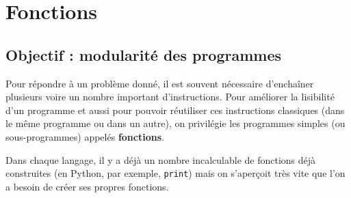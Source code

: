 



\section{Fonctions}
\subsection{Objectif : modularité des programmes}

Pour répondre à un problème donné, il est souvent nécessaire d'enchaîner plusieurs voire un nombre 
important d'instructions. Pour améliorer la lisibilité d'un programme et aussi pour pouvoir réutiliser 
ces instructions classiques (dans le même programme ou dans un autre),
on privilégie les programmes simples (ou sous-programmes) appelés \textbf{fonctions}.

Dans chaque langage, il y a déjà un nombre incalculable de fonctions déjà construites (en Python, 
par exemple, \texttt{print}) mais on s'aperçoit très vite que l'on a besoin de créer ses propres 
fonctions.


